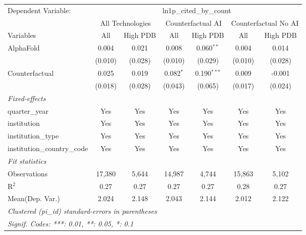 \begingroup
\centering
\begin{tabular}{lcccccc}
   \tabularnewline \midrule \midrule
   Dependent Variable: & \multicolumn{6}{c}{ln1p\_cited\_by\_count}\\
 & \multicolumn{2}{c}{All Technologies} & \multicolumn{2}{c}{Counterfactual AI} & \multicolumn{2}{c}{Counterfactual No AI} \\
\cmidrule(lr){1-1}\cmidrule(lr){2-3} \cmidrule(lr){4-5} \cmidrule(lr){6-7}
Variables & \multicolumn{1}{c}{All} & \multicolumn{1}{c}{High PDB} & \multicolumn{1}{c}{All} & \multicolumn{1}{c}{High PDB} & \multicolumn{1}{c}{All} & \multicolumn{1}{c}{High PDB} \\
\cmidrule(lr){1-1}\cmidrule(lr){2-2} \cmidrule(lr){3-3} \cmidrule(lr){4-4} \cmidrule(lr){5-5} \cmidrule(lr){6-6} \cmidrule(lr){7-7}
   AlphaFold                    & 0.004   & 0.021   & 0.008       & 0.060$^{**}$  & 0.004   & 0.014\\   
                                & (0.010) & (0.028) & (0.010)     & (0.029)       & (0.010) & (0.028)\\   
   Counterfactual               & 0.025   & 0.019   & 0.082$^{*}$ & 0.190$^{***}$ & 0.009   & -0.001\\   
                                & (0.018) & (0.028) & (0.043)     & (0.065)       & (0.017) & (0.024)\\   
   \midrule
   \emph{Fixed-effects}\\
   quarter\_year                & Yes     & Yes     & Yes         & Yes           & Yes     & Yes\\  
   institution                  & Yes     & Yes     & Yes         & Yes           & Yes     & Yes\\  
   institution\_type            & Yes     & Yes     & Yes         & Yes           & Yes     & Yes\\  
   institution\_country\_code   & Yes     & Yes     & Yes         & Yes           & Yes     & Yes\\  
   \midrule
   \emph{Fit statistics}\\
   Observations                 & 17,380  & 5,644   & 14,987      & 4,744         & 15,863  & 5,102\\  
   R$^2$                        & 0.27    & 0.27    & 0.27        & 0.27          & 0.28    & 0.27\\  
Mean(Dep. Var.) & 2.024 & 2.148 & 2.043 & 2.144 & 2.012 & 2.122 \\
   \midrule \midrule
   \multicolumn{7}{l}{\emph{Clustered (pi\_id) standard-errors in parentheses}}\\
   \multicolumn{7}{l}{\emph{Signif. Codes: ***: 0.01, **: 0.05, *: 0.1}}\\
\end{tabular}
\par\endgroup

